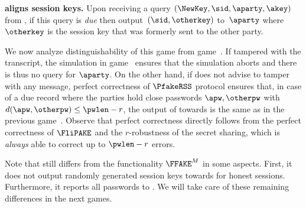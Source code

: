 \begin{games}
\textbf{\Func aligns session keys.}
Upon receiving a query $(\NewKey,\sid,\aparty,\akey)$ from \Sim, if this query is \emph{due} then output~$(\sid,\otherkey)$ to~$\aparty$ where $\otherkey$ is the session key that was formerly sent to the other party. 
 
We now analyze distinguishability of this game from game~\previousgame.
If \Env tampered with the transcript, the simulation in game~ ensures that the simulation aborts and there is thus no \NewKey query for $\aparty$. On the other hand, if \Env does not advise \AdvA to tamper with any message, perfect correctness of $\PfakeRSS$ protocol ensures that, in case of a due record where the parties hold close passwords $\apw,\otherpw$ with $d(\apw,\otherpw)\leq \pwlen-r$, the output of \Func towards \Env is the same as in the previous game~\previousgame. Observe that perfect correctness directly follows from the perfect correctness of $\FliPAKE$ and the $r$-robustness of the secret sharing, which is \emph{always} able to correct up to $\pwlen-r$ errors.

Note that \Func still differs from the functionality $\FFAKE^M$ in some aspects. First, it does not output randomly generated session keys towards \Env for honest sessions. Furthermore, it reports all passwords to \Sim. We will take care of these remaining differences in the next games.


\end{games}
